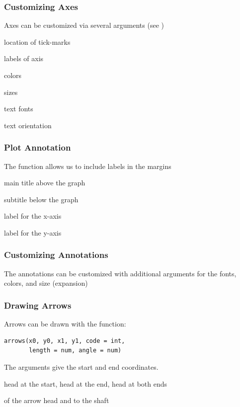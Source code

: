 \documentclass[12pt]{beamer}\usepackage[]{graphicx}\usepackage[]{color}
\begin{document}

\begin{frame}[fragile]
\frametitle{Customizing Axes}

Axes can be customized via several arguments (see )
\bi
  \item location of tick-marks
  \item labels of axis
  \item colors
  \item sizes
  \item text fonts
  \item text orientation 
\ei

\end{frame}


\begin{frame}
\frametitle{Plot Annotation}

The function  allows us to include labels in the margins
\bi
  \item {} main title above the graph
  \item {} subtitle below the graph
  \item {} label for the x-axis
  \item {} label for the y-axis
\ei

\end{frame}


\begin{frame}
\frametitle{Customizing Annotations}

The annotations can be customized with additional arguments for the fonts, colors, and size (expansion)
\bi
  \item {} 
  \item {}
  \item {}
\ei

\end{frame}


\begin{frame}[fragile]
\frametitle{Drawing Arrows}

Arrows can be drawn with the function:
\begin{verbatim}
arrows(x0, y0, x1, y1, code = int, 
       length = num, angle = num)
\end{verbatim}

\bi
  \item The  arguments give the start and end coordinates.
  \item {} head at the start,  head at the end,  head at both ends
  \item {} of the arrow head and  to the shaft
\ei

\end{frame}
\end{document}
